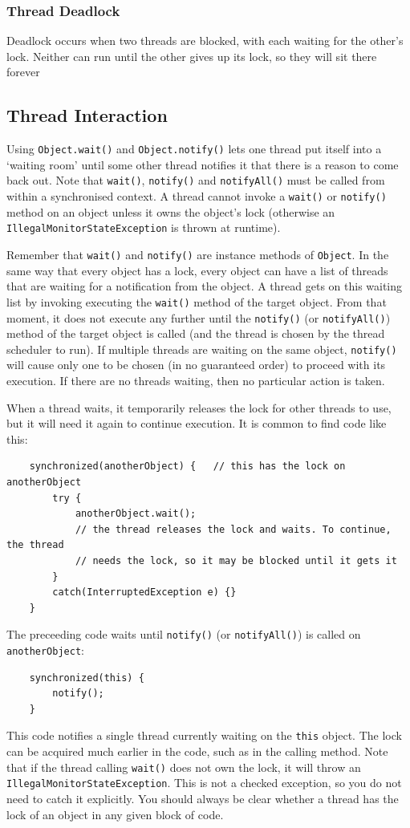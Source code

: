\subsubsection{Thread Deadlock}
Deadlock occurs when two threads are blocked, with each waiting for the other's 
lock. Neither can run until the other gives up its lock, so they will sit there 
forever

\subsection{Thread Interaction}
Using \verb#Object.wait()# and \verb#Object.notify()# lets one thread put 
itself into a `waiting room' until some other thread notifies it that there is 
a reason to come back out. Note that \verb#wait()#, \verb#notify()# and 
\verb#notifyAll()# must be called from within a synchronised context. A thread 
cannot invoke a \verb#wait()# or \verb#notify()# method on an object unless it 
owns the object's lock (otherwise an \verb#IllegalMonitorStateException# is 
thrown at runtime).

Remember that \verb#wait()# and \verb#notify()# are instance methods of 
\verb#Object#. In the same way that every object has a lock, every object can 
have a list of threads that are waiting for a notification from the object. A 
thread gets on this waiting list by invoking executing the \verb#wait()# method 
of the target object. From that moment, it does not execute any further until 
the \verb#notify()# (or \verb#notifyAll()#) method of the target object is 
called (and the thread is chosen by the thread scheduler to run). If multiple 
threads are waiting on the same object, \verb#notify()# will cause only one to 
be chosen (in no guaranteed order) to proceed with its execution. If there are 
no threads waiting, then no particular action is taken.

When a thread waits, it temporarily releases the lock for other threads to use, 
but it will need it again to continue execution. It is common to find code like 
this:
\begin{verbatim}
    synchronized(anotherObject) {   // this has the lock on anotherObject
        try {
            anotherObject.wait();
            // the thread releases the lock and waits. To continue, the thread 
            // needs the lock, so it may be blocked until it gets it
        }
        catch(InterruptedException e) {}
    }
\end{verbatim}
The preceeding code waits until \verb#notify()# (or \verb#notifyAll()#) is 
called on \verb#anotherObject#:
\begin{verbatim}
    synchronized(this) {
        notify();
    }
\end{verbatim}
This code notifies a single thread currently waiting on the \verb#this# object.
The lock can be acquired much earlier in the code, such as in the calling 
method. Note that if the thread calling \verb#wait()# does not own the lock, it 
will throw an \verb#IllegalMonitorStateException#. This is not a checked 
exception, so you do not need to catch it explicitly. You should always be 
clear whether a thread has the lock of an object in any given block of code.

